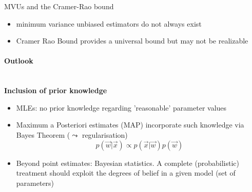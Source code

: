 MVUs and the Cramer-Rao bound
\begin{itemize}
\item minimum variance unbiased estimators do not always exist
\item Cramer Rao Bound  provides a universal bound but may not be realizable
\end{itemize}
 
\paragraph{Outlook}\mbox{}\\
  \textbf{Inclusion of prior knowledge}
    
  \begin{itemize}
  \item MLEs: no prior knowledge regarding 'reasonable' parameter values %
  \item Maximum a Posteriori estimates (MAP) incorporate such
    knowledge via Bayes Theorem ($\leadsto$ regularisation)  
  $$p(\vec{w}|\vec{x}) \propto p(\vec{x}|\vec{w}) p(\vec{w})$$
  \item Beyond point estimates: Bayesian statistics. A complete (probabilistic) treatment should exploit the degrees of belief in a given model (set of parameters)
  \end{itemize}


